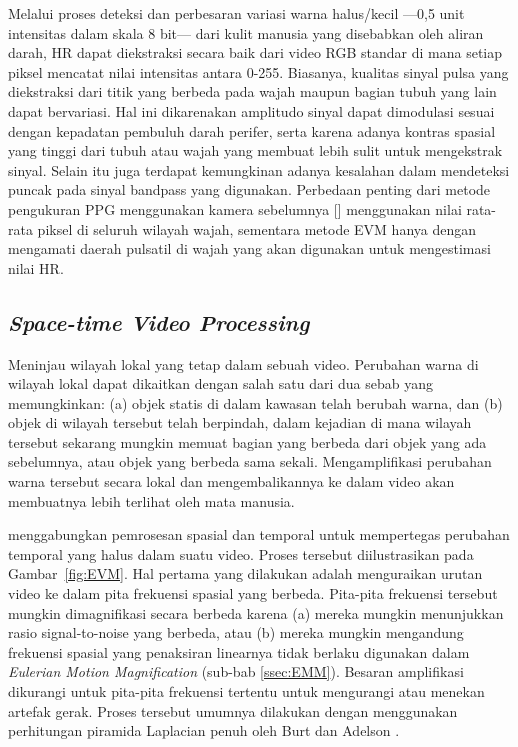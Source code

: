 Melalui proses deteksi dan perbesaran variasi warna halus/kecil ---0,5 unit intensitas dalam skala 8 bit--- dari kulit manusia yang disebabkan oleh aliran darah, HR dapat diekstraksi secara baik dari video RGB standar di mana setiap piksel mencatat nilai intensitas antara 0-255. Biasanya, kualitas sinyal pulsa yang diekstraksi dari titik yang berbeda pada wajah maupun bagian tubuh yang lain dapat bervariasi. Hal ini dikarenakan amplitudo sinyal dapat dimodulasi sesuai dengan kepadatan pembuluh darah perifer, serta karena adanya kontras spasial yang tinggi dari tubuh atau wajah yang membuat lebih sulit untuk mengekstrak sinyal. Selain itu juga terdapat kemungkinan adanya kesalahan dalam mendeteksi puncak pada sinyal bandpass yang digunakan.
Perbedaan penting dari metode pengukuran PPG menggunakan kamera sebelumnya [\citet{kong2013,lazaro2014,lewandowska2011,Mirmo2016,Poh2010,Poh2011,Sun2012,Verkruysse2008}] menggunakan nilai rata-rata piksel di seluruh wilayah wajah, sementara metode EVM hanya dengan mengamati daerah pulsatil di wajah yang akan digunakan untuk mengestimasi nilai HR. 

\subsection{\textit{Space-time Video Processing}}
Meninjau wilayah lokal yang tetap dalam sebuah video. Perubahan warna di wilayah lokal dapat dikaitkan dengan salah satu dari dua sebab yang memungkinkan: (a) objek statis di dalam kawasan telah berubah warna, dan (b) objek di wilayah tersebut telah berpindah, dalam kejadian di mana wilayah tersebut sekarang mungkin memuat bagian yang berbeda dari objek yang ada sebelumnya, atau objek yang berbeda sama sekali. Mengamplifikasi perubahan warna tersebut secara lokal dan mengembalikannya ke dalam video akan membuatnya lebih terlihat oleh mata manusia.

\citet{RubinsteinPhDThesis2014} menggabungkan pemrosesan spasial dan temporal untuk mempertegas perubahan temporal yang halus dalam suatu video. Proses tersebut diilustrasikan pada Gambar~\ref{fig:EVM}. Hal pertama yang dilakukan adalah menguraikan urutan video ke dalam pita frekuensi spasial yang berbeda. Pita-pita frekuensi tersebut mungkin dimagnifikasi secara berbeda karena (a) mereka mungkin menunjukkan rasio signal-to-noise yang berbeda, atau (b) mereka mungkin mengandung frekuensi spasial yang penaksiran linearnya tidak berlaku digunakan dalam \textit{Eulerian Motion Magnification} (sub-bab \ref{ssec:EMM}). Besaran amplifikasi dikurangi untuk pita-pita frekuensi tertentu untuk mengurangi atau menekan artefak gerak. Proses tersebut umumnya dilakukan dengan menggunakan perhitungan piramida Laplacian penuh oleh Burt dan Adelson \citep{burt1987}.

